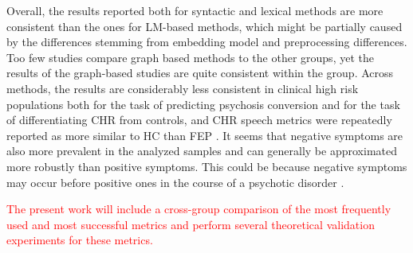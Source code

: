 





Overall, the results reported both for syntactic and lexical methods are more consistent than the ones for LM-based methods, which might be partially caused by the differences stemming from embedding model and preprocessing differences. Too few studies compare graph based methods to the other groups, yet the results of the graph-based studies are quite consistent within the group. Across methods, the results are considerably less consistent in clinical high risk populations both for the task of predicting psychosis conversion and for the task of differentiating CHR from controls, and CHR speech metrics were repeatedly reported as more similar to HC than FEP \citep{morgan2021natural, srivastava2022p473, nettekoven2023semantic}. It seems that negative symptoms are also more prevalent in the analyzed samples and can generally be approximated more robustly than positive symptoms. This could be because negative symptoms may occur before positive ones in the course of a psychotic disorder \citep{just2023validation}.


\textcolor{red}{The present work will include a cross-group comparison of the most frequently used and most successful metrics and perform several theoretical validation experiments for these metrics.}


